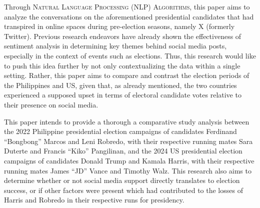 Through \textsc{Natural Language Processing (NLP) Algorithms}, this paper aims to analyze the conversations on the aforementioned presidential candidates that had transpired in online spaces during pre-election seasons, namely X (formerly Twitter). Previous research endeavors have already shown the effectiveness of sentiment analysis in determining key themes behind social media posts, especially in the context of events such as elections. Thus, this research would like to push this idea further by not only contextualizing the data within a single setting. Rather, this paper aims to compare and contrast the election periods of the Philippines and US, given that, as already mentioned, the two countries experienced a supposed upset in terms of electoral candidate votes relative to their presence on social media.

This paper intends to provide a thorough a comparative study analysis between the 2022 Philippine presidential election campaigns of candidates Ferdinand “Bongbong” Marcos and Leni Robredo, with their respective running mates Sara Duterte and Francis “Kiko” Pangilinan, and the 2024 US presidential election campaigns of candidates Donald Trump and Kamala Harris, with their respective running mates James “JD” Vance and Timothy Walz. This research also aims to determine whether or not social media support directly translates to election success, or if other factors were present which had contributed to the losses of Harris and Robredo in their respective runs for presidency.